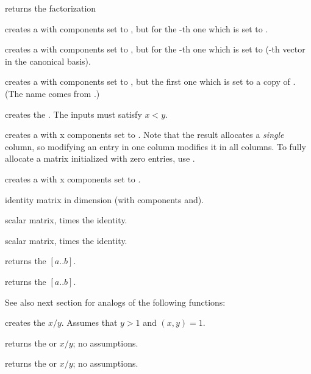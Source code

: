  returns the factorization

 creates a  with 
components set to , but for the -th one which is set to
.

 creates a  with 
components set to , but for the -th one which is set to
 (-th vector in the canonical basis).

 creates a  with 
components set to , but the first one which is set to a copy
of . (The name comes from .)

\smallskip

 creates the  .
The inputs must satisfy $x < y$.

 creates a  with  x 
components set to . Note that the result allocates a
\emph{single} column, so modifying an entry in one column modifies it in
all columns. To fully allocate a matrix initialized with zero entries,
use .

 creates a  with  x
 components set to .

 identity matrix in dimension  (with
components  and).

 scalar matrix,  times the identity.

 scalar matrix,  times
the identity.

 returns the  $[a..b]$.

 returns the  $[a..b]$.

\smallskip
See also next section for analogs of the following functions:

 creates the  $x/y$. Assumes that
$y > 1$ and $(x,y) = 1$.

 returns the  or  $x/y$;
no assumptions.

 returns the  or  $x/y$;
no assumptions.

